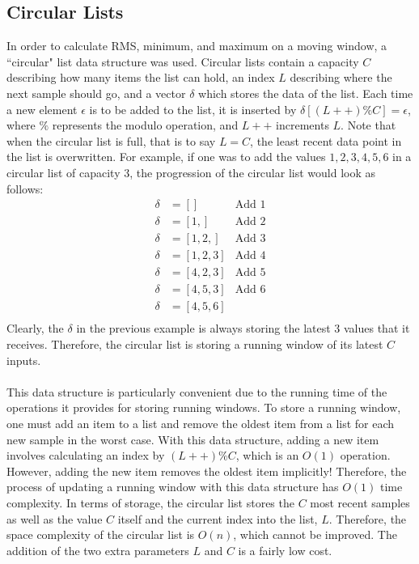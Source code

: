 \documentclass[12pt]{report}
\begin{document}
\newpage
\begin{appendix}
	\chapter{Circular Lists}\label{circularlists}
	In order to calculate RMS, minimum, and maximum on a moving window, a ``circular" list data
	structure was used. Circular lists contain a capacity $C$ describing how many items the list can
	hold, an index $L$ describing where the next sample should go, and a vector $\delta$ which
	stores the data of the list. Each time a new
	element $\epsilon$ is to be added to the list, it is inserted by $\delta[(L++)\%C] = \epsilon$,
	where $\%$ represents the modulo operation, and $L++$ increments $L$. Note that when the
	circular list is full, that is to say $L = C$, the least recent data point in the list is
	overwritten. For example, if one was to add the values $1,2,3,4,5,6$ in a circular list of
	capacity 3, the progression of the circular list would look as follows:
	\begin{equation*}
		\begin{aligned}
			\delta &= [] & \mbox{Add 1}\\
			\delta &= [1,] & \mbox{Add 2}\\
			\delta &= [1,2,] & \mbox{Add 3}\\
			\delta &= [1,2,3] & \mbox{Add 4}\\
			\delta &= [4,2,3] & \mbox{Add 5}\\
			\delta &= [4,5,3] & \mbox{Add 6}\\
			\delta &= [4,5,6]\\
		\end{aligned}
	\end{equation*}
	Clearly, the $\delta$ in the previous example is always storing the latest 3 values that it
	receives. Therefore, the circular list is storing a running window of its latest $C$ inputs.\\\\
	This data structure is particularly convenient due to the running time of the operations it
	provides for storing running windows. To store a running window, one must add an item to a list
	and remove the oldest item from a list for each new sample in the worst case. With this data
	structure, adding a new item involves calculating an index by $(L++)\%C$, which is an $O(1)$
	operation. However, adding the new item removes the oldest item implicitly! Therefore, the
	process of updating a running window with this data structure has $O(1)$ time complexity. In
	terms of storage, the circular list stores the $C$ most recent samples as well as the value $C$
	itself and the current index into the list, $L$. Therefore, the space complexity of the circular
	list is $O(n)$, which cannot be improved. The addition of the two extra parameters $L$ and $C$
	is a fairly low cost.
\end{appendix}
\end{document}
